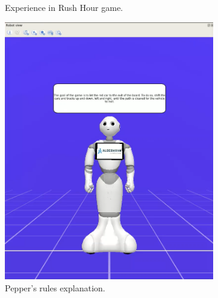 \documentclass{article}
\begin{document}
\begin{figure}[H]
    \centering
    \begin{subfigure}{.5\textwidth}
      \centering
      \caption{Experience in Rush Hour game.}
    \end{subfigure}%
    \begin{subfigure}{.5\textwidth}
      \centering
      \includegraphics[width=0.7\linewidth]{images/7_pepper spiega le regole.png}
      \caption{Pepper's rules explanation.}
    \end{subfigure}
    \newline
    \begin{subfigure}{.5\textwidth}
      \centering

\end{subfigure}
\end{figure}
\end{document}
